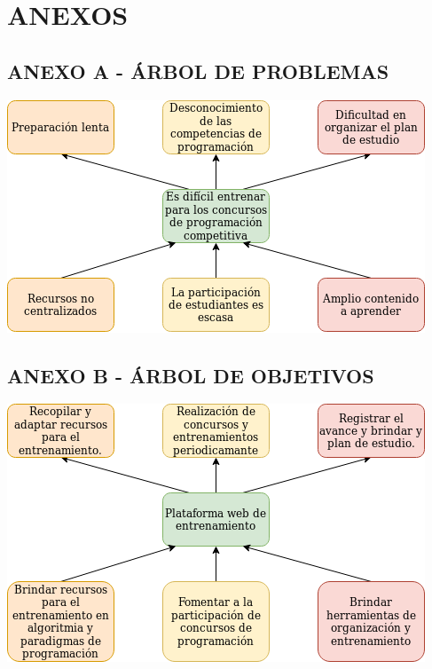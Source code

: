 \newpage

\section*{ANEXOS}

\subsection*{ANEXO A - ÁRBOL DE PROBLEMAS}
\vspace{30mm}
\begin{center}
    \includegraphics[scale=0.9]{imagenes/arbol de problemas.png}
\end{center}

\newpage
\subsection*{ANEXO B - ÁRBOL DE OBJETIVOS}
\vspace{30mm}
\begin{center}
    \includegraphics[scale=0.9]{imagenes/arbol de objetivos.png}
\end{center}

